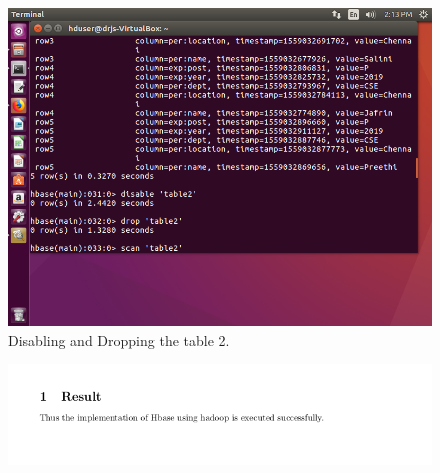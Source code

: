 \documentclass[a4paper,10pt]{article}
\begin{document}
\begin{figure}[h]
	\includegraphics[scale=0.33,center]{18.png}
	\caption{Disabling and Dropping the table 2.}
	\label{fig:17}
\end{figure}
\begin{figure}[h]
	\includegraphics[scale=0.63]{result.png}
	\label{fig:18}
\end{figure}
\end{document}
